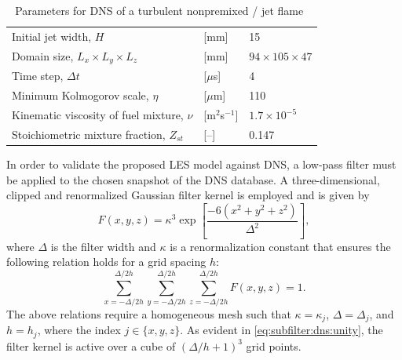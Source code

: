 \begin{table}[htbp]
\centering
\caption[Parameters for DNS of Turbulent Nonpremixed / Jet Flame]{Parameters for DNS of a turbulent nonpremixed / jet flame~\cite{attili2014}}
\label{tab:subfilter:dns:params}
\begin{tabular}{p{} p{} p{}}
\toprule
Initial jet width, $H$
& [mm] & 15 \\[0.2em]

Domain size, $L_x \times L_y \times L_z$
& [mm] & $94 \times 105 \times 47$ \\[0.2em]

Time step, $\Delta t$
& [$\mu$s] & 4 \\[0.2em]

Minimum Kolmogorov scale, $\eta$
& [$\mu$m] & 110 \\[0.2em]

Kinematic viscosity of fuel mixture, $\nu$
& [m$^2$s$^{-1}$] & $1.7 \times 10^{-5}$ \\[0.2em]

Stoichiometric mixture fraction, $Z_{st}$
& [--] & 0.147 \\

\bottomrule
\end{tabular}
\end{table}

In order to validate the proposed LES model against DNS, a low-pass filter must be applied to the chosen snapshot of the DNS database. A three-dimensional, clipped and renormalized Gaussian filter kernel is employed and is given by
\begin{equation}\label{eq:subfilter:dns:kernel}
  F(x,y,z) = \kappa^3\exp\left[ \frac{-6(x^2 + y^2 + z^2)}{\Delta^2} \right],
\end{equation}
where $\Delta$ is the filter width and $\kappa$ is a renormalization constant that ensures the following relation holds for a grid spacing $h$:
\begin{equation}\label{eq:subfilter:dns:unity}
  \sum\limits_{x = -\Delta/2h}^{\Delta/2h} \sum\limits_{y = -\Delta/2h}^{\Delta/2h} \sum\limits_{z = -\Delta/2h}^{\Delta/2h} F(x,y,z) = 1.
\end{equation}
The above relations require a homogeneous mesh such that $\kappa = \kappa_j$, $\Delta = \Delta_j$, and $h = h_j$, where the index $j \in \{ x,y,z \}$. As evident in \cref{eq:subfilter:dns:unity}, the filter kernel is active over a cube of $(\Delta/h + 1)^3$ grid points. 

